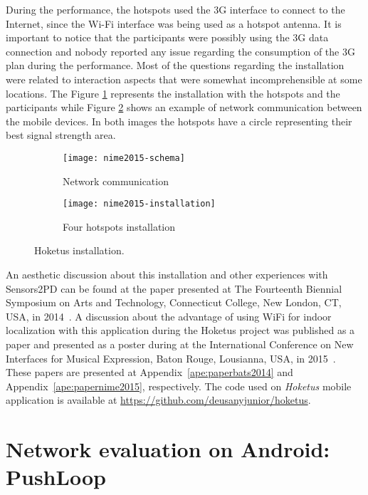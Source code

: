 During the performance, the hotspots used the 3G interface to connect to the Internet, since the Wi-Fi interface was being used as a hotspot antenna. 
It is important to notice that the participants were possibly using the 3G data connection and nobody reported any issue regarding the consumption of the 3G plan during the performance.
Most of the questions regarding the installation were related to interaction aspects that were somewhat incomprehensible at some locations.
The Figure \ref{fig:installation} represents the installation with the hotspots and the participants while Figure \ref{fig:installation-schema} shows an example of network communication between the mobile devices. 
In both images the hotspots have a circle representing their best signal strength area.

\begin{figure*}[!ht]
\centering
\begin{subfigure}{.45\textwidth}
	\texttt{[image: nime2015-schema]}
    \caption{Network communication}
	\label{fig:installation}
\end{subfigure}
\begin{subfigure}{.45\textwidth}
	\texttt{[image: nime2015-installation]}
	\caption{Four hotspots installation}
	\label{fig:installation-schema}
\end{subfigure}

\caption{Hoketus installation.}
\label{fig:hoketusinstallation}
\end{figure*}

An aesthetic discussion about this installation and other experiences with Sensors2PD can be found at the paper presented at The Fourteenth Biennial Symposium on Arts and Technology, Connecticut College, New London, CT, USA, in 2014~\citep{Bandeira2014notes}.
A discussion about the advantage of using WiFi for indoor localization with this application during the Hoketus project was published as a paper and presented as a poster during at the International Conference on New Interfaces for Musical Expression, Baton Rouge, Lousianna, USA, in 2015~\citep{deCarvalhoJunior2015indoor}.
These papers are presented at Appendix~\ref{ape:paperbats2014} and Appendix~\ref{ape:papernime2015}, respectively.
The code used on \textit{Hoketus} mobile application is available at \url{https://github.com/deusanyjunior/hoketus}.


\section{Network evaluation on Android: PushLoop}
\label{sec:apppushloop}

